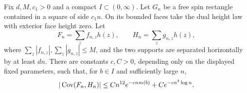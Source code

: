 \begin{lemma}\label{lem:mass-loop-covariance}
Fix \(d,M,c_1>0\) and a compact \(I\subset(0,\infty)\).
Let \(G_n\) be a free spin rectangle contained in a square of side
\(c_1n\).  On its bounded faces take the dual height law with
exterior face height zero.  Let
\[
               F_n=\sum_z f_{n,z}h(z),\qquad
               H_n=\sum_z g_{n,z}h(z),
\]
where \(\sum_z|f_{n,z}|,\sum_z|g_{n,z}|\le M\), and the two
supports are separated horizontally by at least \(dn\).
There are constants \(c,C>0\), depending only on the displayed
fixed parameters, such that, for \(b\in I\) and sufficiently
large \(n\),
\begin{equation}\label{eq:mass-covariance-decay}
 |\operatorname{Cov}(F_n,H_n)|\le
       Cn^{12}e^{-c n m(b)}+Ce^{-c n^4\log n}.
\end{equation}
\end{lemma}

